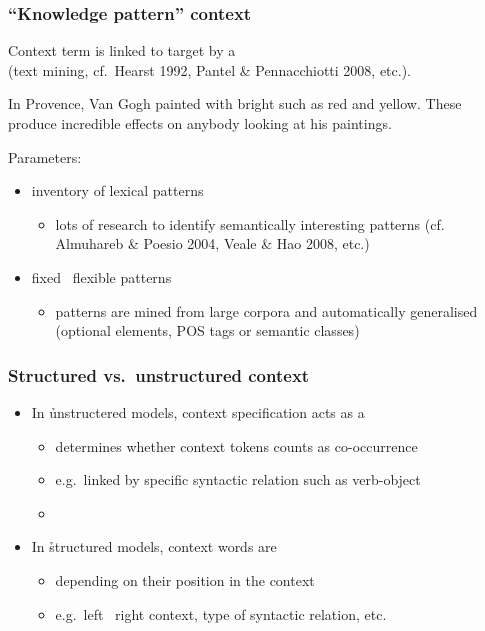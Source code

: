 \begin{frame}
  \frametitle{``Knowledge pattern'' context}
  
  \begin{center}
    Context term is linked to target by a \\
    (text mining, cf.\ Hearst 1992, Pantel \& Pennacchiotti 2008, etc.).
  \end{center}  

  In Provence, Van Gogh painted with bright 
  {\color{counterpoint}such as} {\color{secondary}red} {\color{counterpoint}and}
  {\color{secondary}yellow}.  These 
  {\color{counterpoint}produce} incredible {\color{secondary}effects} on
  anybody looking at his paintings.
  
  \gap
  Parameters:
  \begin{itemize}
  \item inventory of lexical patterns
    \begin{itemize}
    \item lots of research to identify semantically interesting patterns (cf. Almuhareb \& Poesio 2004,
      Veale \& Hao 2008, etc.)
    \end{itemize}
  \item fixed \vs\ flexible patterns
    \begin{itemize}
    \item patterns are mined from large corpora and automatically generalised (optional elements, POS tags or semantic classes)
    \end{itemize}
  \end{itemize}
\end{frame}

\begin{frame}[c]
  \frametitle{Structured vs.\ unstructured context}

  \begin{itemize}
  \item In \h{unstructered} models, context specification acts as a 
    \begin{itemize}
    \item determines whether context tokens counts as co-occurrence
    \item e.g.\ linked by specific syntactic relation such as verb-object
    \item[]
    \end{itemize}
    \pause
  \item In \h{structured} models, context words are 
    \begin{itemize}
    \item depending on their position in the context
    \item e.g.\ left \vs\ right context, type of syntactic relation, etc.
    \end{itemize}
  \end{itemize}
\end{frame}

